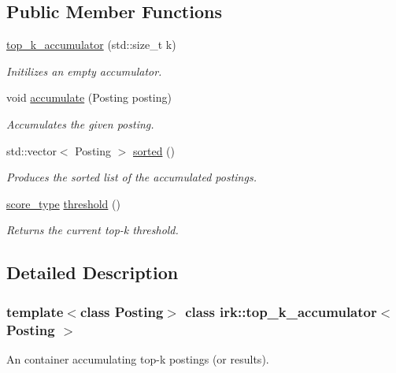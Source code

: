\subsection*{Public Member Functions}
\begin{DoxyCompactItemize}
\item 
\mbox{\hyperlink{classirk_1_1top__k__accumulator_a7baec3d81c3e2e2d33cd4eb1212f951c}{top\+\_\+k\+\_\+accumulator}} (std\+::size\+\_\+t k)
\begin{DoxyCompactList}\small\item\em Initilizes an empty accumulator. \end{DoxyCompactList}\item 
void \mbox{\hyperlink{classirk_1_1top__k__accumulator_a81e919a61cc0fd05dcb77c8fad56fd82}{accumulate}} (Posting posting)
\begin{DoxyCompactList}\small\item\em Accumulates the given posting. \end{DoxyCompactList}\item 
std\+::vector$<$ Posting $>$ \mbox{\hyperlink{classirk_1_1top__k__accumulator_ae89ee96c6485fb5369930e5a2c706aaa}{sorted}} ()
\begin{DoxyCompactList}\small\item\em Produces the sorted list of the accumulated postings. \end{DoxyCompactList}\item 
\mbox{\hyperlink{classirk_1_1top__k__accumulator_a0f5b0bb5549996794b2a06fe17c694d9}{score\+\_\+type}} \mbox{\hyperlink{classirk_1_1top__k__accumulator_a97ec26c362ccb2f9c929be221eb382d6}{threshold}} ()
\begin{DoxyCompactList}\small\item\em Returns the current top-\/k threshold. \end{DoxyCompactList}\end{DoxyCompactItemize}


\subsection{Detailed Description}
\subsubsection*{template$<$class Posting$>$\newline
class irk\+::top\+\_\+k\+\_\+accumulator$<$ Posting $>$}

An container accumulating top-\/k postings (or results). 

